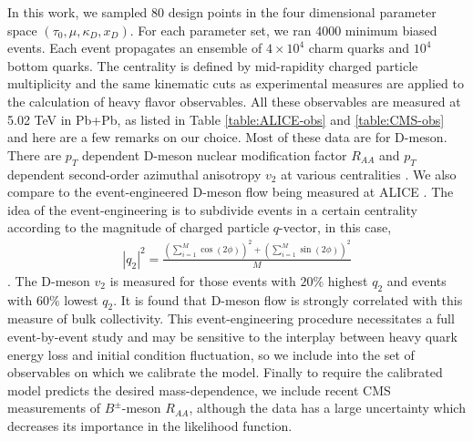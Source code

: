 \documentclass[aps, prc, reprint, amsmath, groupedaddress, nofootinbib]{revtex4-1}
\begin{document}
In this work, we sampled 80 design points in the four dimensional parameter space $(\tau_0, \mu, \kappa_D, x_D)$.
For each parameter set, we ran 4000 minimum biased events.
Each event propagates an ensemble of $4\times 10^4$ charm quarks and $10^4$ bottom quarks.
The centrality is defined by mid-rapidity charged particle multiplicity and the same kinematic cuts as experimental measures are applied to the calculation of heavy flavor observables.
All these observables are measured at 5.02 TeV in Pb+Pb, as listed in Table \ref{table:ALICE-obs} and \ref{table:CMS-obs} and here are a few remarks on our choice.
Most of these data are for D-meson.
There are $p_T$ dependent D-meson nuclear modification factor $R_{AA}$ and $p_T$ dependent second-order azimuthal anisotropy $v_2$ at various centralities \cite{Sirunyan:2017plt, Sirunyan:2017xss, Acharya:2017qps,Grosa:2017zcz}.
We also compare to the event-engineered D-meson flow being measured at ALICE \cite{Grosa:2017zcz}.
The idea of the event-engineering is to subdivide events in a certain centrality according to the magnitude of charged particle $q$-vector, in this case,
\begin{eqnarray}
|q_2|^2 = \frac{\left(\sum_{i=1}^{M} \cos(2\phi) \right)^2+ \left(\sum_{i=1}^{M} \sin(2\phi) \right)^2}{M}
\end{eqnarray}.
The D-meson $v_2$ is measured for those events with $20\%$ highest $q_2$ and events with $60\%$ lowest $q_2$.
It is found that D-meson flow is strongly correlated with this measure of bulk collectivity.
This event-engineering procedure necessitates a full event-by-event study and may be sensitive to the interplay between heavy quark energy loss and initial condition fluctuation, so we include into the set of observables on which we calibrate the model.
Finally to require the calibrated model predicts the desired mass-dependence, we include recent CMS measurements of $B^{\pm}$-meson $R_{AA}$, although the data has a large uncertainty which decreases its importance in the likelihood function.
\end{document}
